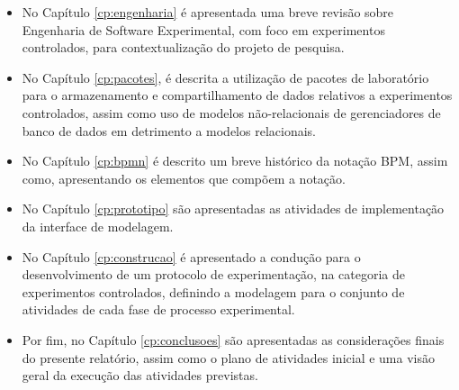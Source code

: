 \begin{itemize}

\item No Capítulo \ref{cp:engenharia} é apresentada uma breve revisão sobre Engenharia de Software Experimental, com foco em experimentos controlados, para contextualização do projeto de pesquisa.

\item No Capítulo \ref{cp:pacotes}, é descrita a utilização de pacotes de laboratório para o armazenamento e compartilhamento de dados relativos a experimentos controlados, assim como uso de modelos não-relacionais de gerenciadores de banco de dados em detrimento a modelos relacionais.

\item No Capítulo \ref{cp:bpmn} é descrito um breve histórico da notação BPM, assim como, apresentando os elementos que compõem a notação.

\item No Capítulo \ref{cp:prototipo} são apresentadas as atividades de implementação da interface de modelagem.

\item No Capítulo \ref{cp:construcao} é apresentado a condução para o desenvolvimento de um protocolo de experimentação, na categoria de experimentos controlados, definindo a modelagem para o conjunto de atividades de cada fase de processo experimental.

\item Por fim, no Capítulo \ref{cp:conclusoes} são apresentadas as considerações finais do presente relatório, assim como o  plano de atividades inicial e uma visão geral da execução das atividades previstas.

\end{itemize}
     

